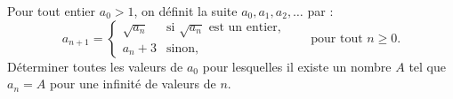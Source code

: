 Pour tout entier $a_0 > 1$, on définit la suite $a_0, a_1, a_2, \ldots$ par :
\[
a_{n+1} = \begin{cases} \sqrt{a_n} & \text{si } \sqrt{a_n} \text{ est un entier,} \\ a_n + 3 & \text{sinon,} \end{cases} \qquad \text{pour tout } n \geqslant 0.
\]
Déterminer toutes les valeurs de $a_0$ pour lesquelles il existe un nombre $A$ tel que $a_n = A$ pour une
infinité de valeurs de $n$.
